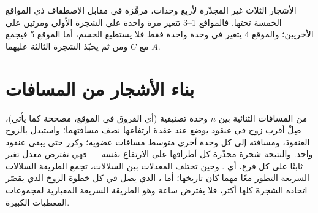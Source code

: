 \begin{omfigure}

{\small الأشجار الثلاث غير المجذّرة لأربع وحدات، مرمَّزة في مقابل
الاصطفاف ذي المواقع الخمسة تحتها. فالمواقع 1--3 تتغير مرة واحدة على الشجرة
الأولى ومرتين على الأخريين؛ والموقع 4 يتغير في وحدة واحدة فقط
فلا يستطيع الحسم، أما الموقع 5 فيجمع $A$ مع $C$ ومن ثم يحبّذ
الشجرة الثالثة عليهما.}
\end{omfigure}

\section{بناء الأشجار من المسافات}

\begin{method}\label{meth:b2:phylogenetic-trees:upgma}
من المسافات الثنائية بين $n$ وحدة تصنيفية (أي الفروق في الموقع،
مصححة كما يأتي)، صِلْ أقرب زوج في عنقود يوضع عند
عقدة ارتفاعها نصف مسافتهما؛ واستبدل بالزوج
العنقودَ، ومسافته إلى كل وحدة أخرى متوسط مسافات
عضويه؛ وكرر حتى يبقى عنقود واحد. والنتيجة
شجرة مجذّرة كل أطرافها على الارتفاع نفسه --- فهي تفترض
معدل تغير ثابتًا على كل فرع، أي . وحين
تختلف المعدلات بين السلالات، تجمع الطريقة السلالات السريعة التطور
معًا مهما كان تاريخها؛ أما \emph{}،
الذي يصل في كل خطوة الزوجَ الذي يقصّر اتحاده الشجرةَ
كلها أكثر، فلا يفترض ساعة وهو الطريقة السريعة المعيارية
لمجموعات المعطيات الكبيرة.
\end{method}

